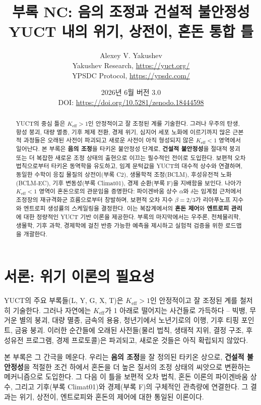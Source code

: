 \documentclass[12pt,a4paper]{article}
\title{\Huge\textbf{부록 NC: 음의 조정과 건설적 불안정성}\\[0.3cm]
	\Large YUCT 내의 위기, 상전이, 혼돈 통합 틀}
\author{Alexey V. Yakushev \\ 
	Yakushev Research, \url{https://yuct.org/} \\ 
	YPSDC Protocol, \url{https://ypsdc.com/}}
\date{2026년 6월 \quad 버전 3.0 \\ \medskip
	DOI: \url{https://doi.org/10.5281/zenodo.18444598}}
\newcommand{\Keff}{K_{\mathrm{eff}}}
\begin{document}
	
	\maketitle
	
	\begin{abstract}
		YUCT의 중심 틀은 \(\Keff > 1\)인 안정적이고 잘 조정된 계를 기술한다. 그러나 우주의 탄생, 항성 붕괴, 대량 멸종, 기후 체제 전환, 경제 위기, 심지어 세포 노화에 이르기까지 많은 근본적 과정들은 오래된 사전이 파괴되고 새로운 사전이 아직 형성되지 않은 \(\Keff < 1\) 영역에서 일어난다. 본 부록은 \textbf{음의 조정}을 타키온 불안정성 단계로, \textbf{건설적 불안정성}을 절대적 붕괴 또는 더 복잡한 새로운 조정 상태의 출현으로 이끄는 필수적인 전이로 도입한다. 보편적 오차 법칙으로부터 타키온 동역학을 유도하고, 임계 문턱값을 YUCT의 대수적 상수와 연결하며, 동일한 수학이 응집 물질의 상전이(부록 C2), 생물학적 조정(BCLM), 후성유전적 노화(BCLM‑EC), 기후 변동성(부록 Climat01), 경제 순환(부록 F)을 지배함을 보인다. 나아가 \(\Keff < 1\) 영역이 혼돈으로의 관문임을 증명한다: 파이겐바움 상수 \(\alpha\)와 \(\delta\)는 임계점 근처에서 조정장의 재규격화군 흐름으로부터 창발하며, 보편적 오차 지수 \(\beta = 2/3\)가 리아푸노프 지수와 엔트로피 생성률의 스케일링을 결정한다. 이는 복잡계에서의 \textbf{혼돈 제어}와 \textbf{엔트로피 관리}에 대한 정량적인 YUCT 기반 이론을 제공한다. 부록의 마지막에서는 우주론, 천체물리학, 생물학, 기후 과학, 경제학에 걸친 반증 가능한 예측을 제시하고 실험적 검증을 위한 로드맵을 개괄한다.
	\end{abstract}
	
	\tableofcontents
	\newpage
	
	\section{서론: 위기 이론의 필요성}
	
	YUCT의 주요 부록들(L, Y, G, X, T)은 \(\Keff > 1\)인 안정적이고 잘 조정된 계를 철저히 기술한다. 그러나 자연에는 \(\Keff\)가 1 아래로 떨어지는 사건들로 가득하다 – 빅뱅, 무거운 별의 붕괴, 대량 멸종, 금속의 용융, 청년기에서 노년기로의 이행, 기후 티핑 포인트, 금융 붕괴. 이러한 순간들에 오래된 사전들(물리 법칙, 생태적 지위, 결정 구조, 후성유전 프로그램, 경제 프로토콜)은 파괴되고, 새로운 것들은 아직 확립되지 않았다.
	
	본 부록은 그 간극을 메운다. 우리는 \textbf{음의 조정}을 잘 정의된 타키온 상으로, \textbf{건설적 불안정성}을 적절한 조건 하에서 혼돈을 더 높은 질서의 조정 상태의 씨앗으로 변환하는 메커니즘으로 도입한다. 그 다음 이 틀을 보편적 오차 법칙, 혼돈 이론의 파이겐바움 상수, 그리고 기후(부록 Climat01)와 경제(부록 F)의 구체적인 관측량에 연결한다. 그 결과는 위기, 상전이, 엔트로피와 혼돈의 제어에 대한 통일된 이론이다.
	
\end{document}

